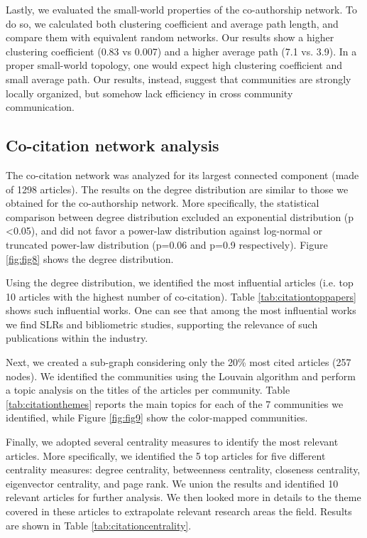 \documentclass[jmse,review,submit,pdftex,moreauthors]{Definitions/mdpi}
\begin{document}
Lastly, we evaluated the small-world properties of the co-authorship network. To do so, we calculated both clustering coefficient and average path length, and compare them with equivalent random networks. Our results show a higher clustering coefficient (0.83 vs 0.007) and a higher average path (7.1 vs. 3.9). In a proper small-world topology, one would expect high clustering coefficient and small average path. Our results, instead, suggest that communities are strongly locally organized, but somehow lack efficiency in cross community communication.

\subsection{Co-citation network analysis}
The co-citation network was analyzed for its largest connected component (made of 1298 articles). The results on the degree distribution are similar to those we obtained for the co-authorship network. More specifically, the statistical comparison between degree distribution excluded an exponential distribution (p \textless 0.05), and did not favor a power-law distribution against log-normal or truncated power-law distribution (p=0.06 and p=0.9 respectively). Figure \ref{fig:fig8} shows the degree distribution.

Using the degree distribution, we identified the most influential articles (i.e. top 10 articles with the highest number of co-citation). Table \ref{tab:citationtoppapers} shows such influential works. One can see that among the most influential works we find SLRs and bibliometric studies, supporting the relevance of such publications within the industry.

Next, we created a sub-graph considering only the 20\% most cited articles (257 nodes). We identified the communities using the Louvain algorithm and perform a topic analysis on the titles of the articles per community. Table \ref{tab:citationthemes} reports the main topics for each of the 7 communities we identified, while Figure \ref{fig:fig9} show the color-mapped communities.

Finally, we adopted several centrality measures to identify the most relevant articles. More specifically, we identified the 5 top articles for five different centrality measures: degree centrality, betweenness centrality, closeness centrality, eigenvector centrality, and page rank. We union the results and identified 10 relevant articles for further analysis. We then looked more in details to the theme covered in these articles to extrapolate relevant research areas the field. Results are shown in Table \ref{tab:citationcentrality}.
\end{document}
